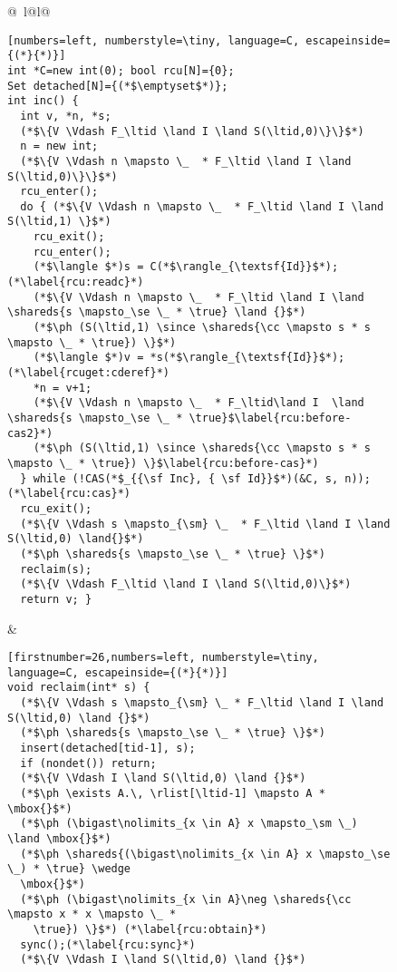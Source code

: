 \begin{figure}[t]
\begin{tabular}{@{\quad\ }l@{}l@{}}
\begin{minipage}[b]{0.52\linewidth}
{\figfontsize
\begin{lstlisting}[numbers=left, numberstyle=\tiny, language=C, escapeinside={(*}{*)}]
int *C=new int(0); bool rcu[N]={0}; 
Set detached[N]={(*$\emptyset$*)};
int inc() {
  int v, *n, *s; 
  (*$\{V \Vdash F_\ltid \land I \land S(\ltid,0)\}\}$*)
  n = new int;
  (*$\{V \Vdash n \mapsto \_  * F_\ltid \land I \land S(\ltid,0)\}\}$*)
  rcu_enter();
  do { (*$\{V \Vdash n \mapsto \_  * F_\ltid \land I \land S(\ltid,1) \}$*)
    rcu_exit();
    rcu_enter();
    (*$\langle $*)s = C(*$\rangle_{\textsf{Id}}$*);(*\label{rcu:readc}*)
    (*$\{V \Vdash n \mapsto \_  * F_\ltid \land I \land \shareds{s \mapsto_\se \_ * \true} \land {}$*)
    (*$\ph (S(\ltid,1) \since \shareds{\cc \mapsto s * s \mapsto \_ * \true}) \}$*) 
    (*$\langle $*)v = *s(*$\rangle_{\textsf{Id}}$*);(*\label{rcuget:cderef}*)
    *n = v+1;
    (*$\{V \Vdash n \mapsto \_  * F_\ltid\land I  \land \shareds{s \mapsto_\se \_ * \true}$\label{rcu:before-cas2}*)
    (*$\ph (S(\ltid,1) \since \shareds{\cc \mapsto s * s \mapsto \_ * \true}) \}$\label{rcu:before-cas}*)
  } while (!CAS(*$_{{\sf Inc}, { \sf Id}}$*)(&C, s, n));(*\label{rcu:cas}*)
  rcu_exit(); 
  (*$\{V \Vdash s \mapsto_{\sm} \_  * F_\ltid \land I \land S(\ltid,0) \land{}$*)
  (*$\ph \shareds{s \mapsto_\se \_ * \true} \}$*) 
  reclaim(s); 
  (*$\{V \Vdash F_\ltid \land I \land S(\ltid,0)\}$*)
  return v; }
\end{lstlisting}
}
\end{minipage}
&
\begin{minipage}[b]{0.7\linewidth}
{\figfontsize
\begin{lstlisting}[firstnumber=26,numbers=left, numberstyle=\tiny, language=C, escapeinside={(*}{*)}]
void reclaim(int* s) {  
  (*$\{V \Vdash s \mapsto_{\sm} \_ * F_\ltid \land I \land S(\ltid,0) \land {}$*)
  (*$\ph \shareds{s \mapsto_\se \_ * \true} \}$*) 
  insert(detached[tid-1], s);
  if (nondet()) return;
  (*$\{V \Vdash I \land S(\ltid,0) \land {}$*)
  (*$\ph \exists A.\, \rlist[\ltid-1] \mapsto A * \mbox{}$*)
  (*$\ph (\bigast\nolimits_{x \in A} x \mapsto_\sm \_) \land \mbox{}$*)
  (*$\ph \shareds{(\bigast\nolimits_{x \in A} x \mapsto_\se \_) * \true} \wedge
  \mbox{}$*) 
  (*$\ph (\bigast\nolimits_{x \in A}\neg \shareds{\cc \mapsto x * x \mapsto \_ *
    \true}) \}$*) (*\label{rcu:obtain}*)
  sync();(*\label{rcu:sync}*)
  (*$\{V \Vdash I \land S(\ltid,0) \land {}$*)

\end{lstlisting}}
\end{minipage}
\end{tabular}
\end{figure}
